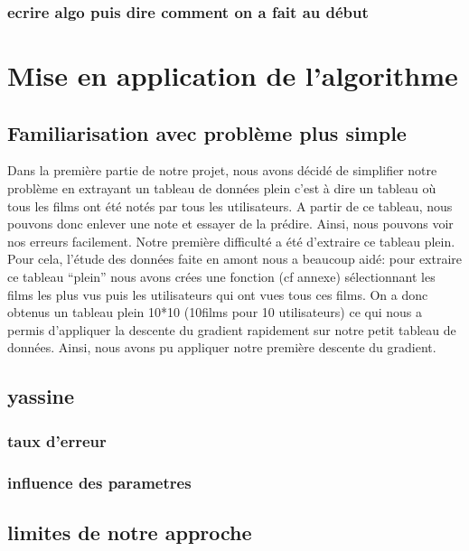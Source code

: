 \documentclass[a4paper,10pt]{article}
\begin{document}
\subsubsection{ecrire algo puis dire comment on a fait au début}
\section{Mise en application de l'algorithme}
\subsection{Familiarisation avec problème plus simple}
Dans la première partie de notre projet, nous avons décidé de simplifier notre problème en extrayant un tableau de données 
plein c'est à dire un tableau où tous les films ont été notés par tous les utilisateurs. 
A partir de ce tableau, nous pouvons donc enlever une note et essayer de la prédire. Ainsi, nous pouvons voir nos erreurs facilement.
Notre première difficulté a été d'extraire ce tableau plein. Pour cela, l'étude des données faite en amont nous a beaucoup aidé: pour extraire ce tableau ``plein''
nous avons crées une fonction (cf annexe) sélectionnant les films les plus vus puis les utilisateurs qui ont vues tous ces films. On a donc obtenus un
tableau plein 10*10 (10films pour 10 utilisateurs) ce qui nous a permis d'appliquer la descente du gradient rapidement sur notre petit tableau de données. Ainsi,
nous avons pu appliquer notre première descente du gradient.
\subsection{yassine}
\subsubsection{taux d'erreur}
\subsubsection{influence des parametres}
\subsection{limites de notre approche}
\end{document}
